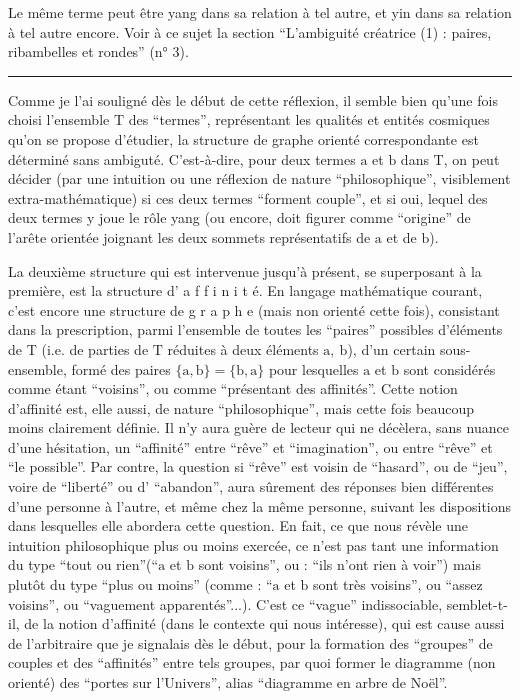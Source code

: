
Le même terme peut être yang dans sa relation à tel autre, et yin dans sa relation à tel autre encore. Voir à ce sujet la section ``L'ambiguité créatrice (1) : paires, ribambelles et rondes'' (n° 3).

\noindent\rule{8em}{.4pt}

Comme je l'ai souligné dès le début de cette réflexion, il semble bien qu'une fois choisi l'ensemble $\mathrm T$ des ``termes'', représentant les qualités et entités cosmiques qu'on se propose d'étudier, la structure de graphe orienté correspondante est déterminé sans ambigu\leavevmode{}\handwritten{\"{\phantom{\i}}}té. C'est-à-dire, pour deux termes $\mathrm a$ et $\mathrm b$ dans $\mathrm T$, on peut décider (par une intuition ou une réflexion de nature ``philosophique'', visiblement extra-mathématique) si ces deux termes ``forment couple'', et si oui, lequel des deux termes y joue le rôle yang (ou encore, doit figurer comme ``origine'' de l'arête orientée joignant les deux sommets représentatifs de $\mathrm a$ et de $\mathrm b$).

La deuxième structure qui est intervenue jusqu'à présent, se superposant à la première, est la structure d' a f f i n i t é. En langage mathématique courant, c'est encore une structure de g r a p h e (mais non orienté cette fois), consistant dans la prescription, parmi l'ensemble de toutes les ``paires'' possibles d'éléments de $\mathrm T$ (i.e. de parties de $\mathrm T$ réduites à deux éléments $\mathrm a,\ \mathrm b$), d'un certain sous-ensemble, formé des paires $\{\mathrm a,\mathrm b\}=\{\mathrm b,\mathrm a\}$ pour lesquelles $\mathrm a$ et $\mathrm b$ sont considérés comme étant ``voisins'', ou comme ``présentant des affinités''. Cette notion d'affinité est, elle aussi, de nature ``philosophique'', mais cette fois beaucoup moins clairement définie. Il n'y aura guère de lecteur qui ne décèlera, sans nuance d'une hésitation, un ``affinité'' entre ``rêve'' et ``imagination'', ou entre ``rêve'' et ``le possible''. Par contre, la question si ``rêve'' est voisin de ``hasard'', ou de ``jeu'', voire de ``liberté'' ou d' ``abandon'', aura sûrement des réponses bien différentes d'une personne à l'autre, et même chez la même personne, suivant les dispositions dans lesquelles elle abordera cette question. En fait, ce que nous révèle une intuition philosophique plus ou moins exercée, ce n'est pas tant une information du type ``tout ou rien''(``$\mathrm a$ et $\mathrm b$ sont voisins'', ou : ``ils n'ont rien à voir'') mais plutôt du type ``plus ou moins'' (comme : ``$\mathrm a$ et $\mathrm b$ sont très voisins'', ou ``assez voisins'', ou ``vaguement apparentés''...). C'est ce ``vague'' indissociable, semblet-t-il, de la notion d'affinité (dans le contexte qui nous intéresse), qui est cause aussi de l'arbitraire que je signalais dès le début, pour la formation des ``groupes'' de couples et des ``affinités'' entre tels groupes, par quoi former le diagramme (non orienté) des ``portes sur l'Univers'', alias ``diagramme en arbre de Noël''.

